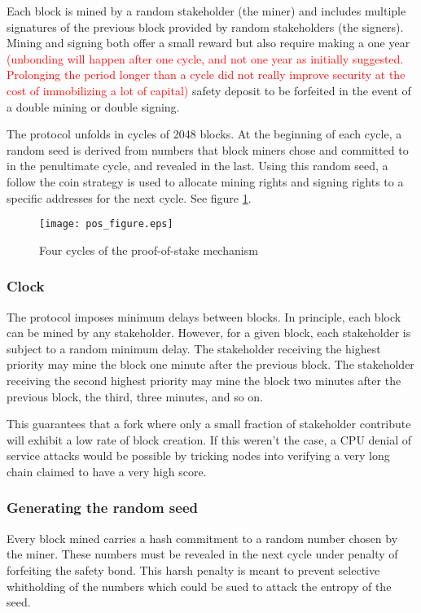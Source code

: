 \documentclass[letterpaper]{article}
\newcommand\change[1]{\textcolor{red}{#1}}
\begin{document}
Each block is mined by a random stakeholder (the miner) and includes
multiple signatures of the previous block provided by random 
stakeholders (the signers). Mining and signing both offer a small reward but
also require making a one year \change{(unbonding will happen after one cycle, and not one year as initially suggested. Prolonging the period longer than a cycle did not really improve security at the cost of immobilizing a lot of capital)} safety deposit to be
forfeited in the event of a double mining or double signing.

The protocol unfolds in cycles of \num{2048} blocks. At the beginning of each
cycle, a random seed is derived from numbers that block miners chose and committed
to in the penultimate cycle, and revealed in the last. Using this random seed,
a follow the coin strategy is used to allocate mining rights and signing rights
to a specific addresses for the next cycle. See figure \ref{fig:pos_figure}.

\begin{figure}[b!]
  \centering
  \texttt{[image: pos\_figure.eps]}
  \caption{Four cycles of the proof-of-stake mechanism}
  \label{fig:pos_figure}
\end{figure}


\subsubsection{Clock}

The protocol imposes minimum delays between blocks. In principle, each block
can be mined by any stakeholder. However, for a given block, each stakeholder
is subject to a random minimum delay. The stakeholder receiving the highest
priority may mine the block one minute after the previous block. The
stakeholder receiving the second highest priority may mine the block two
minutes after the previous block, the third, three minutes, and so on.

This guarantees that a fork where only a small fraction of stakeholder
contribute will exhibit a low rate of block creation. If this weren't 
the case, a CPU denial of service attacks would be possible by
tricking nodes into verifying a very long chain claimed to have a very high
score.

\subsubsection{Generating the random seed}

Every block mined carries a hash commitment to a random number chosen by the
miner. These numbers must be revealed in the next cycle under penalty of
forfeiting the safety bond. This harsh penalty is meant to prevent selective
whitholding of the numbers which could be sued to attack the entropy of the seed. 
\end{document}
